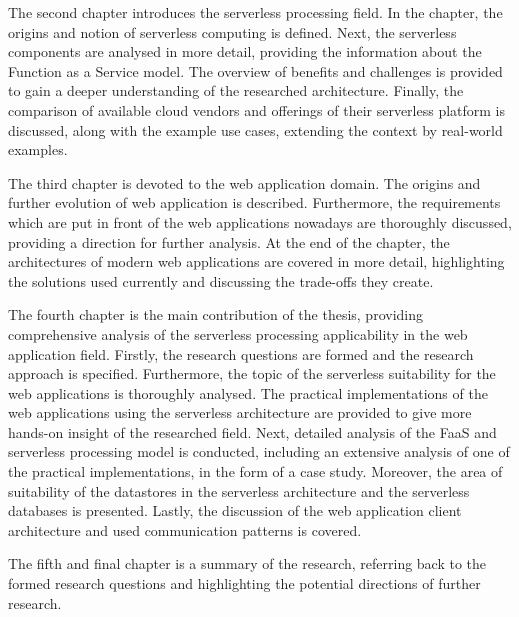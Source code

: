 The second chapter introduces the serverless processing field.
In the chapter, the origins and notion of serverless computing is defined.
Next, the serverless components are analysed in more detail, providing the information about the Function as a Service model.
The overview of benefits and challenges is provided to gain a deeper understanding of the researched architecture.
Finally, the comparison of available cloud vendors and offerings of their serverless platform is discussed, along with the example use cases, extending the context by real-world examples.

The third chapter is devoted to the web application domain. The origins and further evolution of web application is described.
Furthermore, the requirements which are put in front of the web applications nowadays are thoroughly discussed, providing a direction for further analysis.
At the end of the chapter, the architectures of modern web applications are covered in more detail, highlighting the solutions used currently and discussing the trade-offs they create.

The fourth chapter is the main contribution of the thesis, providing comprehensive analysis of the serverless processing applicability in the web application field.
Firstly, the research questions are formed and the research approach is specified.
Furthermore, the topic of the serverless suitability for the web applications is thoroughly analysed.
The practical implementations of the web applications using the serverless architecture are provided to give more hands-on insight of the researched field.
Next, detailed analysis of the FaaS and serverless processing model is conducted, including an extensive analysis of one of the practical implementations, in the form of a case study.
Moreover, the area of suitability of the datastores in the serverless architecture and the serverless databases is presented.
Lastly, the discussion of the web application client architecture and used communication patterns is covered.

The fifth and final chapter is a summary of the research, referring back to the formed research questions and highlighting the potential directions of further research.

